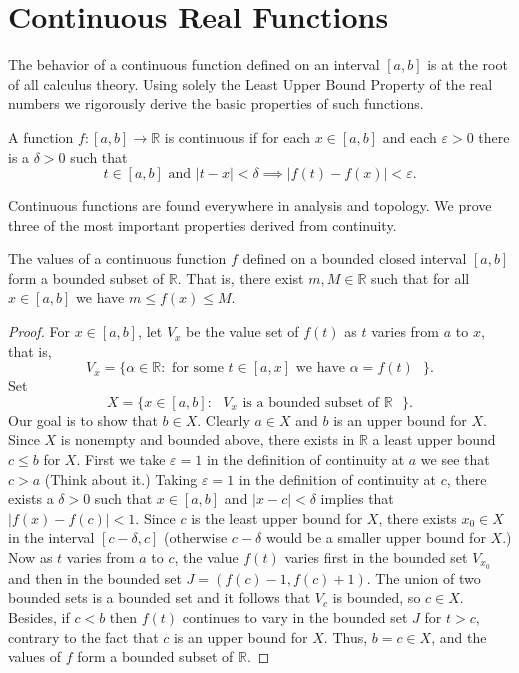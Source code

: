 \chapter{Continuous Real Functions}
\label{chap:continuous}

The behavior of a continuous function defined on an interval $[a,b]$ is at the root of all calculus theory.
Using solely the Least Upper Bound Property of the real numbers we rigorously derive the basic properties of such functions.

\begin{defn}
  A function $f: [a,b] \to \mathbb{R}$ is \textsf{continuous} if for each $x \in [a,b]$ and each $\varepsilon>0$ there is a $\delta>0$ such that
  \[
    t \in [a,b] \text{ and } |t-x| < \delta \implies |f(t)-f(x)| < \varepsilon.
  \]
\end{defn}

Continuous functions are found everywhere in analysis and topology.
We prove three of the most important properties derived from continuity.

\begin{thm}
  \label{thm:cont-bound}
  The values of a continuous function $f$ defined on a bounded closed interval $[a,b]$ form a bounded subset of $\mathbb{R}$.
  That is, there exist $m,M\in\mathbb{R}$ such that for all $x \in [a,b]$ we have $m \leqslant f(x) \leqslant M$.
\end{thm}

\begin{proof}
  For $x \in [a,b]$, let $V_x$ be the value set of $f(t)$ as $t$ varies from $a$ to $x$, that is,
  \[
    V_x = \{ \alpha \in \mathbb{R} \colon \text{ for some $t \in [a,x]$ we have $\alpha = f(t)$ } \}.
  \]
  Set
  \[
    X = \{ x \in [a,b] \colon \text{ $V_x$ is a bounded subset of $\mathbb{R}$ } \}.
  \]
  Our goal is to show that $b \in X$.
  Clearly $a \in X$ and $b$ is an upper bound for $X$.
  Since $X$ is nonempty and bounded above, there exists in $\mathbb{R}$ a least upper bound $c \leqslant b$ for $X$.
  First we take $\varepsilon=1$ in the definition of continuity at $a$ we see that $c > a$
  (Think about it.)
  Taking $\varepsilon = 1$ in the definition of continuity at $c$, there exists a $\delta>0$ such that $x\in[a,b]$ and $|x-c|<\delta$ implies that $|f(x)-f(c)|<1$.
  Since $c$ is the least upper bound for $X$, there exists $x_0\in X$ in the interval $[c-\delta,c]$ (otherwise $c-\delta$ would be a smaller upper bound for $X$.)
  Now as $t$ varies from $a$ to $c$, the value $f(t)$ varies first in the bounded set $V_{x_0}$ and then in the bounded set $J=(f(c)-1,f(c)+1)$.
  The union of two bounded sets is a bounded set and it follows that $V_c$ is bounded, so $c\in X$.
  Besides, if $c<b$ then $f(t)$ continues to vary in the bounded set $J$ for $t>c$, contrary to the fact that $c$ is an upper bound for $X$.
  Thus, $b = c \in X$, and the values of $f$ form a bounded subset of $\mathbb{R}$.
\end{proof}

